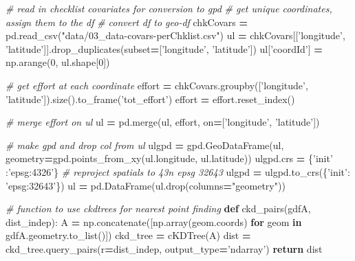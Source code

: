 \documentclass[]{article}
\newenvironment{Shaded}{\begin{snugshade}}{\end{snugshade}}
\newcommand{\CommentTok}[1]{\textcolor[rgb]{0.56,0.35,0.01}{\textit{#1}}}
\newcommand{\ControlFlowTok}[1]{\textcolor[rgb]{0.13,0.29,0.53}{\textbf{#1}}}
\newcommand{\DecValTok}[1]{\textcolor[rgb]{0.00,0.00,0.81}{#1}}
\newcommand{\KeywordTok}[1]{\textcolor[rgb]{0.13,0.29,0.53}{\textbf{#1}}}
\newcommand{\NormalTok}[1]{#1}
\newcommand{\OperatorTok}[1]{\textcolor[rgb]{0.81,0.36,0.00}{\textbf{#1}}}
\newcommand{\StringTok}[1]{\textcolor[rgb]{0.31,0.60,0.02}{#1}}
\begin{document}
\begin{Shaded}
\begin{Highlighting}[numbers=left,,]
\CommentTok{# read in checklist covariates for conversion to gpd}
\CommentTok{# get unique coordinates, assign them to the df}
\CommentTok{# convert df to geo-df}
\NormalTok{chkCovars }\OperatorTok{=}\NormalTok{ pd.read_csv(}\StringTok{"data/03_data-covars-perChklist.csv"}\NormalTok{)}
\NormalTok{ul }\OperatorTok{=}\NormalTok{ chkCovars[[}\StringTok{'longitude'}\NormalTok{, }\StringTok{'latitude'}\NormalTok{]].drop_duplicates(subset}\OperatorTok{=}\NormalTok{[}\StringTok{'longitude'}\NormalTok{, }\StringTok{'latitude'}\NormalTok{])}
\NormalTok{ul[}\StringTok{'coordId'}\NormalTok{] }\OperatorTok{=}\NormalTok{ np.arange(}\DecValTok{0}\NormalTok{, ul.shape[}\DecValTok{0}\NormalTok{])}

\CommentTok{# get effort at each coordinate}
\NormalTok{effort }\OperatorTok{=}\NormalTok{ chkCovars.groupby([}\StringTok{'longitude'}\NormalTok{, }\StringTok{'latitude'}\NormalTok{]).size().to_frame(}\StringTok{'tot_effort'}\NormalTok{)}
\NormalTok{effort }\OperatorTok{=}\NormalTok{ effort.reset_index()}

\CommentTok{# merge effort on ul}
\NormalTok{ul }\OperatorTok{=}\NormalTok{ pd.merge(ul, effort, on}\OperatorTok{=}\NormalTok{[}\StringTok{'longitude'}\NormalTok{, }\StringTok{'latitude'}\NormalTok{])}

\CommentTok{# make gpd and drop col from ul}
\NormalTok{ulgpd }\OperatorTok{=}\NormalTok{ gpd.GeoDataFrame(ul, geometry}\OperatorTok{=}\NormalTok{gpd.points_from_xy(ul.longitude, ul.latitude))}
\NormalTok{ulgpd.crs }\OperatorTok{=}\NormalTok{ \{}\StringTok{'init'}\NormalTok{ :}\StringTok{'epsg:4326'}\NormalTok{\}}
\CommentTok{# reproject spatials to 43n epsg 32643}
\NormalTok{ulgpd }\OperatorTok{=}\NormalTok{ ulgpd.to_crs(\{}\StringTok{'init'}\NormalTok{: }\StringTok{'epsg:32643'}\NormalTok{\})}
\NormalTok{ul }\OperatorTok{=}\NormalTok{ pd.DataFrame(ul.drop(columns}\OperatorTok{=}\StringTok{"geometry"}\NormalTok{))}

\CommentTok{# function to use ckdtrees for nearest point finding}
\KeywordTok{def}\NormalTok{ ckd_pairs(gdfA, dist_indep):}
\NormalTok{    A }\OperatorTok{=}\NormalTok{ np.concatenate([np.array(geom.coords) }\ControlFlowTok{for}\NormalTok{ geom }\KeywordTok{in}\NormalTok{ gdfA.geometry.to_list()])}
\NormalTok{    ckd_tree }\OperatorTok{=}\NormalTok{ cKDTree(A)}
\NormalTok{    dist }\OperatorTok{=}\NormalTok{ ckd_tree.query_pairs(r}\OperatorTok{=}\NormalTok{dist_indep, output_type}\OperatorTok{=}\StringTok{'ndarray'}\NormalTok{)}
    \ControlFlowTok{return}\NormalTok{ dist}


\end{Highlighting}
\end{Shaded}
\end{document}
